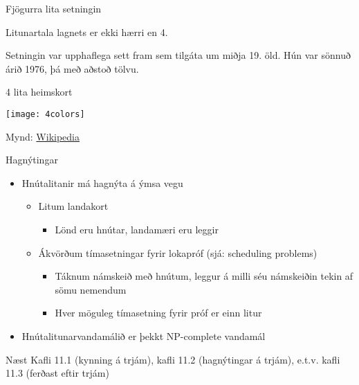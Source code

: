 \documentclass[handout]{beamer}
\begin{document}
\begin{frame}{Fjögurra lita setningin}
\begin{tcolorbox}[title=Fjögurra lita setningin]
Litunartala lagnets er ekki hærri en 4.
\end{tcolorbox}
Setningin var upphaflega sett fram sem tilgáta um miðja 19. öld. Hún var sönnuð árið 1976, þá með aðstoð tölvu.
\end{frame}

\begin{frame}{4 lita heimskort}
    \begin{center}
        \texttt{[image: 4colors]}
    
    Mynd: \href{https://commons.wikimedia.org/wiki/File:World_map_with_four_colours.svg}{Wikipedia}
    \end{center}
\end{frame}

\begin{frame}{Hagnýtingar}
\begin{itemize}
 \item Hnútalitanir má hagnýta á ýmsa vegu
 \begin{itemize}
  \item Litum landakort
  \begin{itemize}
   \item Lönd eru hnútar, landamæri eru leggir
  \end{itemize}
  \item Ákvörðum tímasetningar fyrir lokapróf (sjá: scheduling problems)
  \begin{itemize}
   \item Táknum námskeið með hnútum, leggur á milli séu námskeiðin tekin af sömu nemendum
   \item Hver möguleg tímasetning fyrir próf er einn litur
  \end{itemize}
 \end{itemize}
 \item Hnútalitunarvandamálið er þekkt NP-complete vandamál
\end{itemize}
\end{frame}

\begin{frame}{Næst}
Kafli 11.1 (kynning á trjám), kafli 11.2 (hagnýtingar á trjám), e.t.v. kafli 11.3 (ferðast eftir trjám)
\end{frame}
\end{document}
